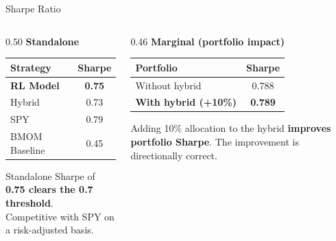 \documentclass[aspectratio=169,11pt]{beamer}
\begin{document}
\begin{frame}{Sharpe Ratio}
  \vspace{0.6em}
  \begin{columns}[T]
    \begin{column}{0.50\textwidth}
      \textbf{Standalone}\\[0.4em]
      \begin{center}
      \begin{tabular}{lc}
        \toprule
        Strategy & Sharpe \\
        \midrule
        \rowcolor{blue!8}
        \textbf{RL Model} & \textbf{0.75} \\
        Hybrid & 0.73 \\
        SPY & 0.79 \\
        BMOM Baseline & 0.45 \\
        \bottomrule
      \end{tabular}
      \end{center}
      \vspace{0.4em}
      \small Standalone Sharpe of \textbf{0.75 clears the 0.7 threshold}.\\
      Competitive with SPY on a risk-adjusted basis.
    \end{column}
    \begin{column}{0.46\textwidth}
      \textbf{Marginal (portfolio impact)}\\[0.4em]
      \begin{center}
      \begin{tabular}{lc}
        \toprule
        Portfolio & Sharpe \\
        \midrule
        Without hybrid & 0.788 \\
        \rowcolor{green!8}
        \textbf{With hybrid (+10\%)} & \textbf{0.789} \\
        \bottomrule
      \end{tabular}
      \end{center}
      \vspace{0.4em}
      \small Adding 10\% allocation to the hybrid \textbf{improves portfolio Sharpe}.
      The improvement is directionally correct.
    \end{column}
  \end{columns}
\end{frame}

\end{document}
